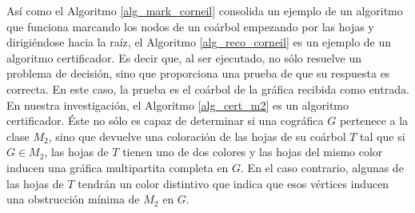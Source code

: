Así como el Algoritmo \ref{alg_mark_corneil} consolida un ejemplo de un
algoritmo que funciona marcando los nodos de un coárbol empezando por las
hojas y dirigiéndose hacia la raíz, el Algoritmo \ref{alg_reco_corneil} es
un ejemplo de un algoritmo certificador. Es decir que, al ser ejecutado, no
sólo resuelve un problema de decisión, sino que proporciona una prueba de
que su respuesta es correcta. En este caso, la prueba es el coárbol de la
gráfica recibida como entrada. En nuestra investigación, el Algoritmo
\ref{alg_cert_m2} es un algoritmo certificador. Éste no sólo es capaz de
determinar si una cográfica $G$ pertenece a la clase $M_2$, sino que
devuelve una coloración de las hojas de su coárbol $T$ tal que si $G\in
M_2$, las hojas de $T$ tienen uno de dos colores y las hojas del mismo color
inducen una gráfica multipartita completa en $G$. En el caso contrario,
algunas de las hojas de $T$ tendrán un color distintivo que indica que esos
vértices inducen una obstrucción mínima de $M_2$ en $G$.


